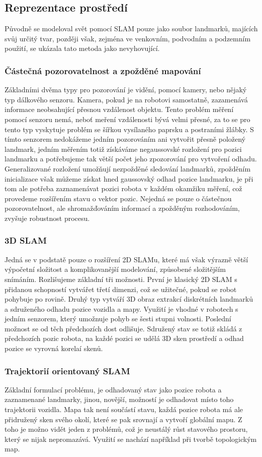 \documentclass[11pt]{article}
\begin{document}
\subsection{Reprezentace prostředí}
Původně se modeloval svět pomocí SLAM pouze jako soubor landmarků, majících svůj určitý tvar, později však, zejména ve venkovním, podvodním a podzemním použití, se ukázala tato metoda jako nevyhovující.
\subsubsection{Částečná pozorovatelnost a zpožděné mapování}
Základními dvěma typy pro pozorování je vidění, pomocí kamery, nebo nějaký typ dálkového senzoru. Kamera, pokud je na robotovi samostatně, zazamenává informace neobsahující přesnou vzdálenost objektu. Tento problém měření pomocí senzoru nemá, neboť meření vzdálenosti bývá velmi přesné, za to se pro tento typ vyskytuje problém se šířkou vysílaného paprsku a postraními žlábky. S tímto senzorem nedokážeme jedním pozorováním ani vytvořit přesně položený landmark, jedním měřením totiž získáváme negaussovské rozložení pro pozici landmarku a potřebujeme tak větší počet jeho zpozorování pro vytvoření odhadu.\\
\indent Generalizované rozložení umožňují nezpožděné sledování landmarků, zpožděním inicializace však můžeme získat hned gaussovský odhad pozice landmarku, je při tom ale potřeba zaznamenávat pozici robota v každém okamžiku měření, což provedeme rozšířením stavu o vektor pozic. Nejedná se pouze o částečnou pozorovatelnost, ale shromažďováním informací a zpožděným rozhodováním, zvyšuje robustnost procesu. 
\subsubsection{3D SLAM}
Jedná se v podstatě pouze o rozšíření 2D SLAMu, které má však výrazně větší výpočetní složitost a komplikovanější modelování, způsobené složitějším snímáním. Rozlišujeme základní tři možnosti. První je klasický 2D SLAM s přidanou schopností vytvářet třetí dimenzi, což se užitečné, pokud se robot pohybuje po rovině. Druhý typ vytváří 3D obraz extrakcí diskrétních landmarků a sdruženého odhadu pozice vozidla a mapy. Využití je vhodné v robotech s jedním senzorem, který umožnuje pohyb se šesti stupni volnosti. Poslední možnost se od těch předchozích dost odlišuje. Sdružený stav se totiž skládá z předchozích pozic robota, na každé pozici se udělá 3D sken prostředí a odhad pozice se vyrovná korelaí skenů. 
\subsubsection{Trajektorií orientovaný SLAM}
Základní formulací problému, je odhadovaný stav jako pozice robota a zaznamenané landmarky, jinou, novější, možností je odhadovat místo toho trajektorii vozidla. Mapa tak není součástí stavu, každá pozice robota má ale přidružený sken svého okolí, které se pak srovnají a vytvoří globální mapu. Z toho je možno vidět jeden z problémů, což je neustálý růst stavového prostoru, který se nijak nepromazává. Využití se nachází například při tvorbě topologickým map.
\end{document}
